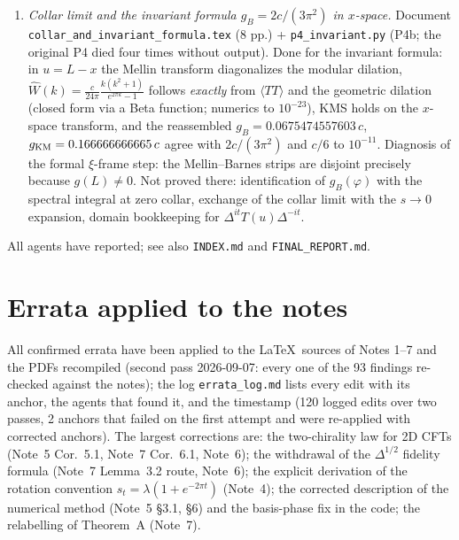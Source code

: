 \begin{enumerate}[leftmargin=1.6em]
\item[(d)] \emph{Collar limit and the invariant formula $g_B=2c/(3\pi^2)$ in $x$-space.} Document \texttt{collar\_and\_invariant\_formula.tex} (8 pp.) + \texttt{p4\_invariant.py} (P4b; the original P4 died four times without output). Done for the invariant formula: in $u=L-x$ the Mellin transform diagonalizes the modular dilation, $\widehat W(k)=\frac{c}{24\pi}\frac{k(k^2+1)}{e^{2\pi k}-1}$ follows \emph{exactly} from $\langle TT\rangle$ and the geometric dilation (closed form via a Beta function; numerics to $10^{-23}$), KMS holds on the $x$-space transform, and the reassembled $g_B=0.0675474557603\,c$, $g_{\rm KM}=0.166666666665\,c$ agree with $2c/(3\pi^2)$ and $c/6$ to $10^{-11}$. Diagnosis of the formal $\xi$-frame step: the Mellin--Barnes strips are disjoint precisely because $g(L)\neq0$. Not proved there: identification of $g_B(\varphi)$ with the spectral integral at zero collar, exchange of the collar limit with the $s\to0$ expansion, domain bookkeeping for $\Delta^{it}T(u)\Delta^{-it}$.
\end{enumerate}
All agents have reported; see also \texttt{INDEX.md} and \texttt{FINAL\_REPORT.md}.

\section{Errata applied to the notes}
All confirmed errata have been applied to the \LaTeX\ sources of Notes 1--7 and the PDFs recompiled (second pass 2026-09-07: every one of the 93 findings re-checked against the notes); the log \texttt{errata\_log.md} lists every edit with its anchor, the agents that found it, and the timestamp (120 logged edits over two passes, 2 anchors that failed on the first attempt and were re-applied with corrected anchors). The largest corrections are: the two-chirality law for 2D CFTs (Note~5 Cor.~5.1, Note~7 Cor.~6.1, Note~6); the withdrawal of the $\Delta^{1/2}$ fidelity formula (Note~7 Lemma~3.2 route, Note~6); the explicit derivation of the rotation convention $s_t=\lambda(1+e^{-2\pi t})$ (Note~4); the corrected description of the numerical method (Note~5 \S3.1, \S6) and the basis-phase fix in the code; the relabelling of Theorem~A (Note~7).
